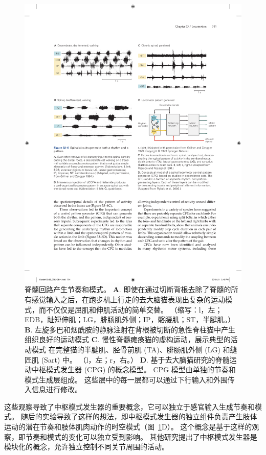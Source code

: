\begin{figure}[htbp]
	\centering
	\includegraphics[width=0.95\linewidth]{chap33/fig_33_6}
	\caption{脊髓回路产生节奏和模式。
	\textbf{A}. 即使在通过切断背根去除了脊髓的所有感觉输入之后，在跑步机上行走的去大脑猫表现出复杂的运动模式，而不仅仅是屈肌和伸肌活动的简单交替。 （缩写：l，左；EDB，趾短伸肌；LG，腓肠肌外侧；IP，髂腰肌；ST，半腱肌。）\cite{grillner1984effect}
	\textbf{B}. 左旋多巴和烟酰胺的静脉注射在背根被切断的急性脊柱猫中产生组织良好的运动模式\cite{grillner1979central}
	\textbf{C}. 慢性脊髓瘫痪猫的虚构运动，展示典型的活动模式 在完整猫的半腱肌、胫骨前肌 (TA)、腓肠肌外侧 (LG) 和缝匠肌 (Sart) 中。 （l，左；r，右。）\cite{pearson1991fictive}
	\textbf{D}. 基于去大脑猫研究的脊髓运动中枢模式发生器 (CPG) 的概念模型。
	CPG 模型由单独的节奏和模式生成层组成。
	这些层中的每一层都可以通过下行输入和外围传入信息进行修改\cite{rybak2006modelling}。}
	\label{fig:33_6}
\end{figure}


这些观察导致了中枢模式发生器的重要概念，它可以独立于感官输入生成节奏和模式。
随后的实验导致了这样的想法，即中枢模式发生器的独立组件负责产生肢体运动的潜在节奏和肢体肌肉动作的时空模式（图~\ref{fig:33_6}D）。
这个概念是基于这样的观察，即节奏和模式的变化可以独立受到影响。
其他研究提出了中枢模式发生器是模块化的概念，允许独立控制不同关节周围的活动。


